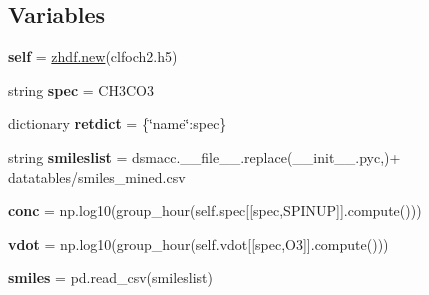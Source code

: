 \subsection*{Variables}
\begin{DoxyCompactItemize}
\item 
\mbox{\label{namespacedsmacc_1_1vis_1_1ropa_a9a88c1f223eed62931c7d418ad42f0b5}} 
{\bfseries self} = \mbox{\hyperlink{classzhdf_1_1new}{zhdf.\+new}}(\textquotesingle{}clfoch2.\+h5\textquotesingle{})
\item 
\mbox{\label{namespacedsmacc_1_1vis_1_1ropa_ad2d07dcef12cb91b3c109d1b2e5fe546}} 
string {\bfseries spec} = \textquotesingle{}C\+H3\+C\+O3\textquotesingle{}
\item 
\mbox{\label{namespacedsmacc_1_1vis_1_1ropa_af9489c1bb72c8f40f8d539864d755d00}} 
dictionary {\bfseries retdict} = \{\char`\"{}name\char`\"{}\+:spec\}
\item 
\mbox{\label{namespacedsmacc_1_1vis_1_1ropa_a49eb687f6f7a052fedd779c0c0de711b}} 
string {\bfseries smileslist} = dsmacc.\+\_\+\+\_\+file\+\_\+\+\_\+.\+replace(\textquotesingle{}\+\_\+\+\_\+init\+\_\+\+\_\+.\+pyc\textquotesingle{},\textquotesingle{}\textquotesingle{})+ \textquotesingle{}datatables/smiles\+\_\+mined.\+csv\textquotesingle{}
\item 
\mbox{\label{namespacedsmacc_1_1vis_1_1ropa_a70d42c0faf16492f6744eae946b936d1}} 
{\bfseries conc} = np.\+log10(group\+\_\+hour(self.\+spec\mbox{[}\mbox{[}spec,\textquotesingle{}S\+P\+I\+N\+UP\textquotesingle{}\mbox{]}\mbox{]}.compute()))
\item 
\mbox{\label{namespacedsmacc_1_1vis_1_1ropa_a2a576755fc740cd7a0e2b45b57c9f0b5}} 
{\bfseries vdot} = np.\+log10(group\+\_\+hour(self.\+vdot\mbox{[}\mbox{[}spec,\textquotesingle{}O3\textquotesingle{}\mbox{]}\mbox{]}.compute()))
\item 
\mbox{\label{namespacedsmacc_1_1vis_1_1ropa_a2bfc5de2157acc7bb2cd5d6ed57754c4}} 
{\bfseries smiles} = pd.\+read\+\_\+csv(smileslist)
\item 

\end{DoxyCompactItemize}
